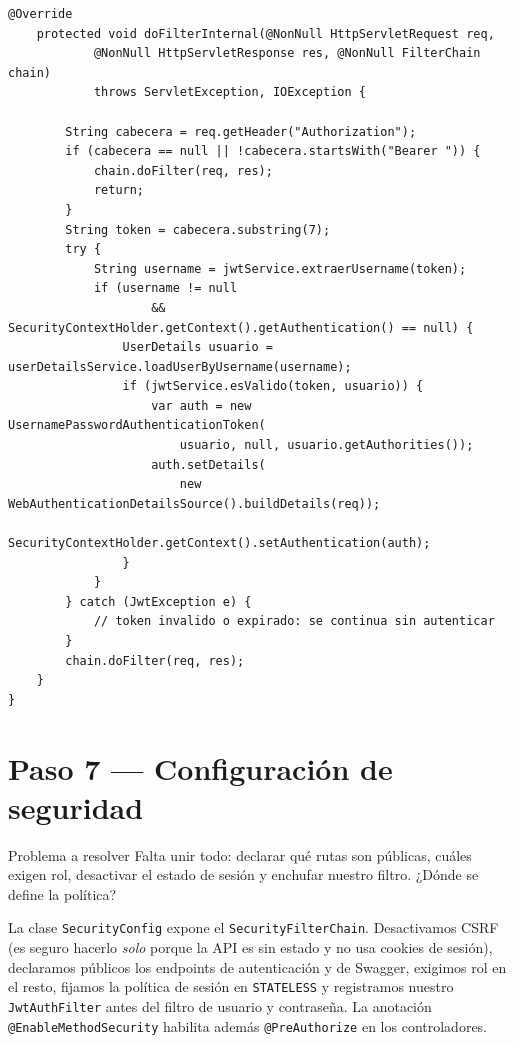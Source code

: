 \documentclass[11pt]{article}
\begin{document}
\begin{cajacodigo}
\begin{lstlisting}[style=java]
    @Override
    protected void doFilterInternal(@NonNull HttpServletRequest req,
            @NonNull HttpServletResponse res, @NonNull FilterChain chain)
            throws ServletException, IOException {

        String cabecera = req.getHeader("Authorization");
        if (cabecera == null || !cabecera.startsWith("Bearer ")) {
            chain.doFilter(req, res);
            return;
        }
        String token = cabecera.substring(7);
        try {
            String username = jwtService.extraerUsername(token);
            if (username != null
                    && SecurityContextHolder.getContext().getAuthentication() == null) {
                UserDetails usuario = userDetailsService.loadUserByUsername(username);
                if (jwtService.esValido(token, usuario)) {
                    var auth = new UsernamePasswordAuthenticationToken(
                        usuario, null, usuario.getAuthorities());
                    auth.setDetails(
                        new WebAuthenticationDetailsSource().buildDetails(req));
                    SecurityContextHolder.getContext().setAuthentication(auth);
                }
            }
        } catch (JwtException e) {
            // token invalido o expirado: se continua sin autenticar
        }
        chain.doFilter(req, res);
    }
}
\end{lstlisting}
\end{cajacodigo}

\section{Paso 7 --- Configuración de seguridad}
\begin{cajaproblema}{Problema a resolver}
Falta unir todo: declarar qué rutas son públicas, cuáles exigen rol, desactivar el estado de sesión y enchufar nuestro filtro. ¿Dónde se define la política?\par
\end{cajaproblema}
La clase \texttt{SecurityConfig} expone el \texttt{SecurityFilterChain}. Desactivamos CSRF (es seguro hacerlo \emph{solo} porque la API es sin estado y no usa cookies de sesión), declaramos públicos los endpoints de autenticación y de Swagger, exigimos rol en el resto, fijamos la política de sesión en \texttt{STATELESS} y registramos nuestro \texttt{JwtAuthFilter} antes del filtro de usuario y contraseña. La anotación \texttt{@EnableMethodSecurity} habilita además \texttt{@PreAuthorize} en los controladores.
\end{document}
